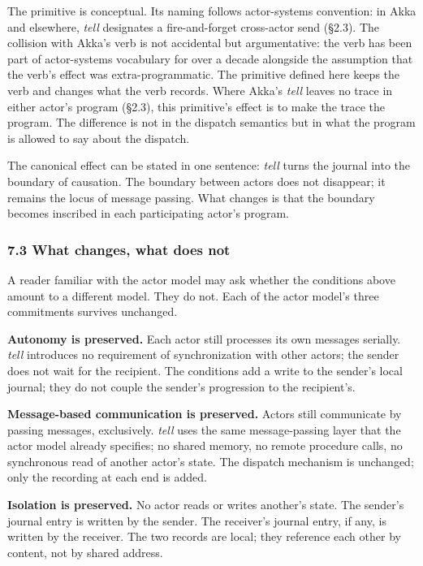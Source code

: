 \documentclass[
]{article}
\begin{document}
The primitive is conceptual. Its naming follows actor-systems
convention: in Akka and elsewhere, \emph{tell} designates a
fire-and-forget cross-actor send (§2.3). The collision with Akka's verb
is not accidental but argumentative: the verb has been part of
actor-systems vocabulary for over a decade alongside the assumption that
the verb's effect was extra-programmatic. The primitive defined here
keeps the verb and changes what the verb records. Where Akka's
\emph{tell} leaves no trace in either actor's program (§2.3), this
primitive's effect is to make the trace the program. The difference is
not in the dispatch semantics but in what the program is allowed to say
about the dispatch.

The canonical effect can be stated in one sentence: \emph{tell} turns
the journal into the boundary of causation. The boundary between actors
does not disappear; it remains the locus of message passing. What
changes is that the boundary becomes inscribed in each participating
actor's program.

\subsubsection{7.3 What changes, what does
not}\label{what-changes-what-does-not}

A reader familiar with the actor model may ask whether the conditions
above amount to a different model. They do not. Each of the actor
model's three commitments survives unchanged.

\textbf{Autonomy is preserved.} Each actor still processes its own
messages serially. \emph{tell} introduces no requirement of
synchronization with other actors; the sender does not wait for the
recipient. The conditions add a write to the sender's local journal;
they do not couple the sender's progression to the recipient's.

\textbf{Message-based communication is preserved.} Actors still
communicate by passing messages, exclusively. \emph{tell} uses the same
message-passing layer that the actor model already specifies; no shared
memory, no remote procedure calls, no synchronous read of another
actor's state. The dispatch mechanism is unchanged; only the recording
at each end is added.

\textbf{Isolation is preserved.} No actor reads or writes another's
state. The sender's journal entry is written by the sender. The
receiver's journal entry, if any, is written by the receiver. The two
records are local; they reference each other by content, not by shared
address.
\end{document}
